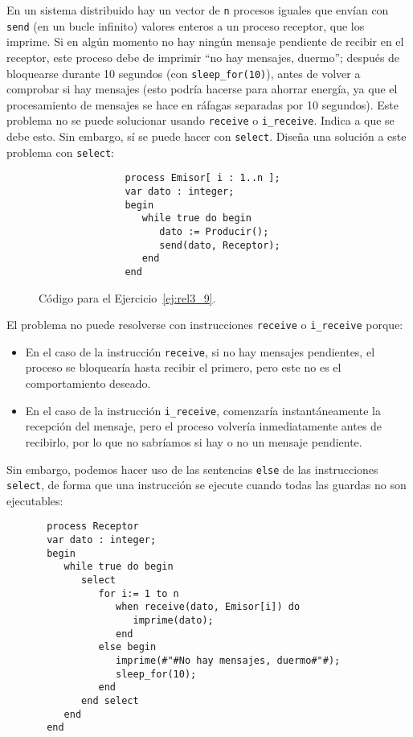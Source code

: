 \begin{ejercicio}\label{ej:rel3_9}
   En un sistema distribuido hay un vector de \verb|n| procesos iguales que envían con \verb|send| (en un bucle infinito) valores enteros a un proceso receptor, que los imprime. Si en algún momento no hay ningún mensaje pendiente de recibir en el receptor, este proceso debe de imprimir ``no hay mensajes, duermo''; después de bloquearse durante 10 segundos (con \verb|sleep_for(10)|), antes de volver a comprobar si hay mensajes (esto podría hacerse para ahorrar energía, ya que el procesamiento de mensajes se hace en ráfagas separadas por 10 segundos). Este problema no se puede solucionar usando \verb|receive| o \verb|i_receive|. Indica a que se debe esto. Sin embargo, sí se puede hacer con \verb|select|. Diseña una solución a este problema con \verb|select|:
    \begin{figure}[H]
       \centering
           \begin{verbatim}
               process Emisor[ i : 1..n ];
               var dato : integer;
               begin
                  while true do begin
                     dato := Producir();
                     send(dato, Receptor);
                  end
               end
           \end{verbatim}
       \caption{Código para el Ejercicio~\ref{ej:rel3_9}.}
       \label{fig:cod_9}
   \end{figure}
   El problema no puede resolverse con instrucciones \verb|receive| o \verb|i_receive| porque:
   \begin{itemize}
       \item En el caso de la instrucción \verb|receive|, si no hay mensajes pendientes, el proceso se bloquearía hasta recibir el primero, pero este no es el comportamiento deseado.
       \item En el caso de la instrucción \verb|i_receive|, comenzaría instantáneamente la recepción del mensaje, pero el proceso volvería inmediatamente antes de recibirlo, por lo que no sabríamos si hay o no un mensaje pendiente.
   \end{itemize}
   Sin embargo, podemos hacer uso de las sentencias \verb|else| de las instrucciones \verb|select|, de forma que una instrucción se ejecute cuando todas las guardas no son ejecutables:
   \begin{verbatim}
       process Receptor
       var dato : integer;
       begin
          while true do begin
             select
                for i:= 1 to n
                   when receive(dato, Emisor[i]) do
                      imprime(dato);
                   end
                else begin
                   imprime(#"#No hay mensajes, duermo#"#);
                   sleep_for(10);
                end
             end select
          end
       end
   \end{verbatim}
\end{ejercicio}

